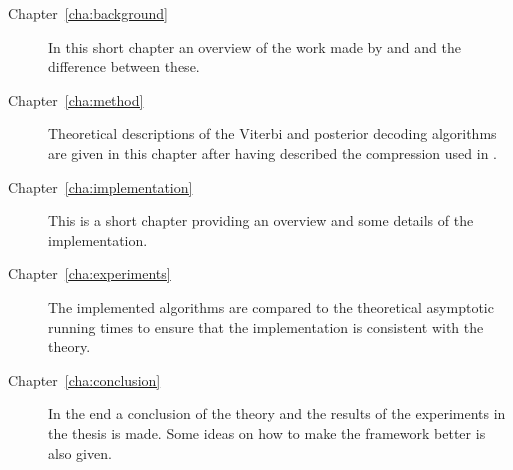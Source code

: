 \begin{description}
\item[Chapter~\ref{cha:background}] In this short chapter an overview of
  the work made by \citet{lifshits2009speeding} and \citet{sand2013ziphmmlib}
  and the difference between these.
\item[Chapter~\ref{cha:method}] Theoretical descriptions of the Viterbi and
  posterior decoding algorithms are given in this chapter after having
  described the compression used in \citet{sand2013ziphmmlib}.
\item[Chapter~\ref{cha:implementation}] This is a short chapter providing an
  overview and some details of the implementation.
\item[Chapter~\ref{cha:experiments}] The implemented algorithms are compared to
  the theoretical asymptotic running times to ensure that the implementation
  is consistent with the theory.
\item[Chapter~\ref{cha:conclusion}] In the end a conclusion of the theory and
  the results of the experiments in the thesis is made. Some ideas on how to
  make the framework better is also given.
\end{description}

